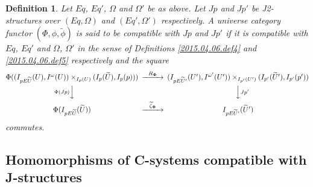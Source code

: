 \documentclass[12pt]{article}
\newtheorem{definition}[proposition]{Definition}
\newcommand{\llabel}[1]{\label{#1}}
\newcommand{\wt}{\widetilde}
\begin{document}
\begin{definition}
\llabel{2015.04.06.def6}
Let $Eq$, $Eq'$, $\Omega$ and $\Omega'$ be as above. Let $Jp$ and $Jp'$ be J2-structures over $(Eq,\Omega)$ and $(Eq',\Omega')$ respectively.  A universe category functor $(\Phi,\phi,\wt{\phi})$ is said to be compatible with $Jp$ and $Jp'$ if it is compatible with $Eq$, $Eq'$ and $\Omega$, $\Omega'$ in the sense of Definitions \ref{2015.04.06.def4} and \ref{2015.04.06.def5} respectively and 
the square
%
$$
\begin{CD}
\Phi((I_{pE\wt{U}}(U), I^{\omega}(U))\times_{I_p(U)} (I_p(\wt{U}), I_p(p))) @>R_{\bf\Phi}>> (I_{pE\wt{U}'}(U'),I^{\omega'}(U'))\times_{I_{p'}(U')}(I_{p'}(\wt{U}'),I_{p'}(p'))\\
@V\Phi(Jp) VV @VVJp' V\\
\Phi(I_{pE\wt{U}}(\wt{U})) @>\wt{\zeta}_{\bf\Phi}>> I_{pE\wt{U}'}(\wt{U}')
\end{CD}
$$
%
commutes. 
\end{definition}













\subsection{Homomorphisms of C-systems compatible with J-structures}
%
\end{document}
